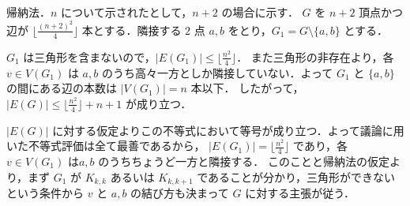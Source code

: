 \subsection{}
帰納法．$n$ について示されたとして，$n+2$ の場合に示す．
$G$ を $n+2$ 頂点かつ辺が $\lfloor \frac{(n+2)^2}{4}\rfloor$ 本とする．隣接する $2$ 点 $a,b$ をとり，$G_1 = G\setminus \{a,b\}$ とする．

$G_1$ は三角形を含まないので，$|E(G_1)|\leq \lfloor\frac{n^2}{4}\rfloor$．
また三角形の非存在より，各 $v\in V(G_1)$ は $a,b$ のうち高々一方としか隣接していない．よって $G_1$ と $\{a,b\}$ の間にある辺の本数は $|V(G_1)| = n$ 本以下．
したがって，$|E(G)|\leq \lfloor\frac{n^2}{4}\rfloor + n + 1$ が成り立つ．

$|E(G)|$ に対する仮定よりこの不等式において等号が成り立つ．よって議論に用いた不等式評価は全て最善であるから，
$|E(G_1)| = \lfloor\frac{n^2}{4}\rfloor$ であり，各 $v\in V(G_1)$ は$a,b$ のうちちょうど一方と隣接する．
このことと帰納法の仮定より，まず $G_1$ が $K_{k,k}$ あるいは $K_{k,k+1}$ であることが分かり，三角形ができないという条件から $v$ と $a,b$ の結び方も決まって $G$ に対する主張が従う．
